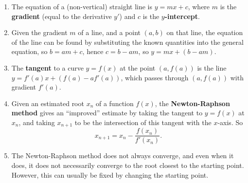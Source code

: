 \documentclass{article}
\begin{document}
\begin{enumerate}
	\item The equation of a (non-vertical) straight line is $y=mx+c$, where $m$ is the \textbf{gradient} (equal to the derivative $y'$) and $c$ is the \textbf{$y$-intercept}.
	\item Given the gradient $m$ of a line, and a point $(a,b)$ on that line, the equation of the line can be found by substituting the known quantities into the general equation, so $b=am+c$, hence $c=b-am$, so $y=mx+(b-am)$.
	\item The \textbf{tangent} to a curve $y=f(x)$ at the point $(a,f(a))$ is the line $y=f'(a)x + (f(a)-af'(a))$, which passes through $(a,f(a))$ with gradient $f'(a)$.
	\item Given an estimated root $x_n$ of a function $f(x)$, the \textbf{Newton-Raphson method} gives an ``improved'' estimate by taking the tangent to $y=f(x)$ at $x_n$, and taking $x_{n+1}$ to be the intersection of this tangent with the $x$-axis. So
		\[x_{n+1}=x_n-\frac{f(x_n)}{f'(x_n)}.\]
	\item The Newton-Raphson method does not always converge, and even when it does, it does not necessarily converge to the root closest to the starting point. However, this can usually be fixed by changing the starting point.
\end{enumerate}
\end{document}
